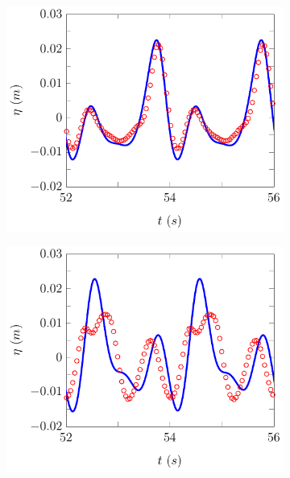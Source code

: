 \begin{figure}
	\centering
	\begin{subfigure}{0.5\textwidth}
		\includegraphics[width=\textwidth]{./chp6/figures/Experiment/Beji/sl/FEVMWG5.pdf}
		\vspace{0.5cm}
	\end{subfigure}%
	\begin{subfigure}{0.5\textwidth}
		\includegraphics[width=\textwidth]{./chp6/figures/Experiment/Beji/sl/FEVMWG6.pdf}
		\vspace{0.5cm}

\end{subfigure}
\end{figure}
